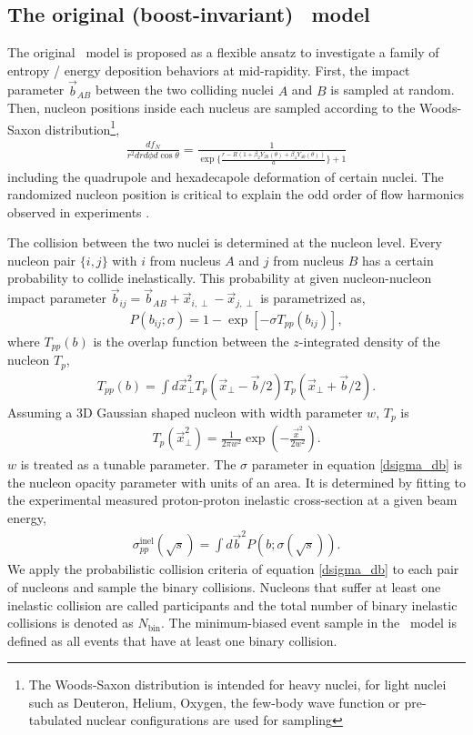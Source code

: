 \subsection{The original (boost-invariant) \trento\ model}
The original \trento\ model is proposed as a flexible ansatz to investigate a family of entropy / energy deposition behaviors at mid-rapidity.
First, the impact parameter $\vec{b}_{AB}$ between the two colliding nuclei $A$ and $B$ is sampled at random.
Then, nucleon positions inside each nucleus are sampled according to the Woods-Saxon distribution\footnote{ \singlespacing  The Woods-Saxon distribution is intended for heavy nuclei, for light nuclei such as Deuteron, Helium, Oxygen, the few-body wave function or pre-tabulated nuclear configurations are used for sampling},
\begin{eqnarray}
\frac{df_N}{r^2 dr d\phi d\cos\theta} = \frac{1}{\exp\{\frac{r-R(1+\beta_2 Y_{20}(\theta)+\beta_4 Y_{40}(\theta))}{a}\}+1}
\end{eqnarray}
including the quadrupole and hexadecapole deformation of certain nuclei.
The randomized nucleon position is critical to explain the odd order of flow harmonics observed in experiments \cite{Alver:2010gr}.

The collision between the two nuclei is determined at the nucleon level. 
Every nucleon pair $\{i, j\}$ with $i$ from nucleus $A$ and $j$ from nucleus $B$ has a certain probability to collide inelastically.
This probability at given nucleon-nucleon impact parameter $\vec{b}_{ij} = \vec{b}_{AB} + \vec{x}_{i, \perp} -  \vec{x}_{j, \perp}$ is parametrized as,
\begin{eqnarray}
P(b_{ij}; \sigma) = 1 - \exp\left[-\sigma T_{pp}(b_{ij})\right],
\label{dsigma_db}
\end{eqnarray}
where $T_{pp}(b)$ is the overlap function between the $z$-integrated density of the nucleon $T_p$,
\begin{eqnarray}
T_{pp}(b) = \int d\vec{x}_\perp^2 T_p(\vec{x}_\perp-\vec{b}/2) T_p(\vec{x}_\perp+\vec{b}/2).
\end{eqnarray}
Assuming a 3D Gaussian shaped nucleon with width parameter $w$, $T_p$ is
\begin{eqnarray}
T_p(\vec{x}_\perp^2) = \frac{1}{2\pi w^2} \exp\left(-\frac{\vec{x}^2}{2w^2}\right).
\end{eqnarray}
$w$ is treated as a tunable parameter.
The $\sigma$ parameter in equation \ref{dsigma_db} is the nucleon opacity parameter with units of an area.
It is determined by fitting to the experimental measured proton-proton inelastic cross-section at a given beam energy,
\begin{eqnarray}
\sigma_{pp}^\text{inel}(\sqrt{s}) = \int d\vec{b}^2 P(b; \sigma(\sqrt{s})).
\end{eqnarray}
We apply the probabilistic collision criteria of equation \ref{dsigma_db} to each pair of nucleons and sample the binary collisions. 
Nucleons that suffer at least one inelastic collision are called participants and the total number of binary inelastic collisions is denoted as $N_{\textrm{bin}}$.
The minimum-biased event sample in the \trento\ model is defined as all events that have at least one binary collision.

